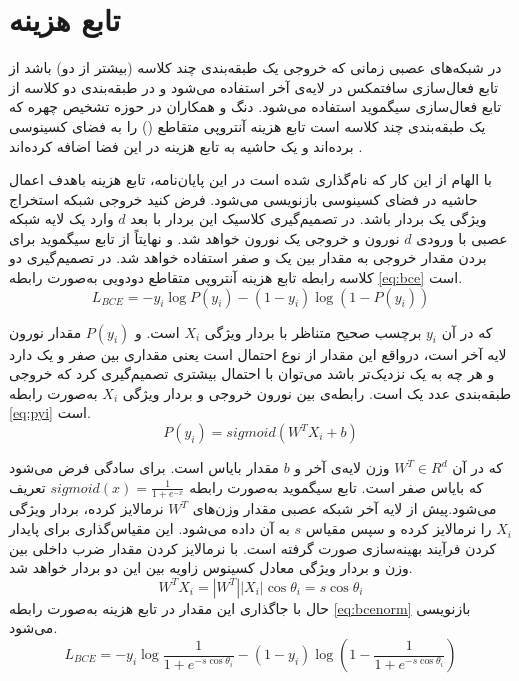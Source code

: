 \section{تابع هزینه }
در شبکه‌های عصبی زمانی که خروجی یک طبقه‌بندی چند کلاسه (بیشتر از دو) باشد از تابع فعال‌سازی سافتمکس
 در لایه‌ی آخر استفاده می‌شود و در طبقه‌بندی دو کلاسه از تابع فعال‌سازی سیگموید 
 استفاده می‌شود. دنگ و همکاران در حوزه تشخیص چهره
  که یک طبقه‌بندی چند کلاسه است تابع هزینه آنتروپی متقاطع
   () را به فضای کسینوسی برده‌اند و یک حاشیه به تابع هزینه در این فضا اضافه کرده‌اند
\cite{deng2019arcface}.

با الهام از این کار که  نام‌گذاری شده است در این پایان‌نامه، تابع هزینه  با‌هدف اعمال حاشیه در فضای کسینوسی بازنویسی می‌شود. فرض کنید خروجی شبکه استخراج ویژگی یک بردار  باشد. در تصمیم‌گیری کلاسیک این بردار با بعد $d$ وارد یک لایه شبکه عصبی با ورودی $d$ نورون و خروجی یک نورون خواهد شد. و نهایتاً از تابع سیگموید برای بردن مقدار خروجی به مقدار بین یک و صفر استفاده خواهد شد.
در تصمیم‌گیری دو کلاسه رابطه تابع هزینه آنتروپی متقاطع دودویی به‌صورت رابطه
\ref{eq:bce}
است.
\begin{equation}\label{eq:bce}
	L_{BCE} = -y_i \log{P(y_i)} - (1-y_i)\log{( 1-P(y_i) )}
\end{equation}

 که در آن 
$y_i$
  برچسب صحیح متناظر با بردار ویژگی
$X_i$ 
  است. و 
$P(y_i)$
   مقدار نورون لایه آخر است، در‌واقع این مقدار از نوع احتمال است یعنی مقداری بین صفر و یک دارد و هر چه به یک نزدیک‌تر باشد می‌توان با احتمال بیشتری تصمیم‌گیری کرد که خروجی طبقه‌بندی عدد یک است.
رابطه‌ی بین نورون خروجی و بردار ویژگی  
$X_i$
 به‌صورت رابطه
\ref{eq:pyi}
است.
\begin{equation}\label{eq:pyi}
	P(y_i) = sigmoid(W^TX_i+b)
\end{equation}

که در آن  
$W^T \in R^d$
وزن لایه‌ی آخر و $b$ مقدار بایاس است. برای سادگی فرض می‌شود که بایاس صفر است.  تابع سیگموید به‌صورت رابطه
$sigmoid(x) = \frac{1}{1+e^{-x}}$
 تعریف می‌شود.پیش از لایه آخر شبکه عصبی مقدار وزن‌های 
$W^T$
 نرمالایز کرده، بردار ویژگی 
$X_i$
  را نرمالایز کرده و سپس مقیاس $s$ به آن داده می‌شود. این مقیاس‌گذاری برای پایدار کردن فرآیند بهینه‌سازی صورت گرفته است.
  با نرمالایز کردن مقدار ضرب داخلی بین وزن و بردار ویژگی معادل کسینوس زاویه بین این دو بردار خواهد شد.
 \begin{equation}\label{eq:wti}
	W^TX_i = |W^T||X_i| \cos{\theta_i}=s\cos{\theta_i}
 \end{equation}
حال با جاگذاری این مقدار در تابع هزینه  به‌صورت رابطه
\ref{eq:bcenorm}
 بازنویسی می‌شود.
\begin{equation}\label{eq:bcenorm}
	L_{BCE} = -y_i \log{\frac{1}{1+e^{-s\cos{\theta_i}}}} - (1-y_i)\log{(1-\frac{1}{1+e^{-s\cos{\theta_i}}} )}
\end{equation}

